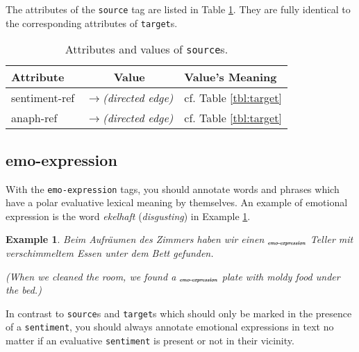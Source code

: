 \documentclass[11pt,a4paper]{article}
\newlength{\clmnwidth}
\theoremstyle{mytheoremstyle}
\newtheorem{exmp}{Example}[section]
\newcommand{\mtag}[2]{{\upshape[\emph{#2}\upshape]$_{\textrm{\bfseries\emph{\tiny
        #1}}}$}}
\newcommand{\emoexpression}[2][]{\mtag{emo-\-ex\-pression\ifstrempty{#1}{}{:#1}}{#2}}
\begin{document}
The attributes of the \texttt{source} tag are listed in Table
\ref{tbl:source}.  They are fully identical to the corresponding
attributes of \texttt{target}s.
\begin{center}
  \begin{table}[h]
    \caption{Attributes and values of \texttt{source}s.}
    \begin{tabular}{|l|c|p{0.935\clmnwidth}|}\hline
      Attribute & Value & Value's Meaning\\\hline

      sentiment-ref & \textit{$\longrightarrow$\newline(directed
        edge)} & cf. Table \ref{tbl:target}\\\hline

      anaph-ref & \textit{$\longrightarrow$\newline(directed edge)} &
      cf. Table \ref{tbl:target}\\\hline
    \end{tabular}\label{tbl:source}
  \end{table}
\end{center}

\subsection{emo-expression}
With the \texttt{emo-expression} tags, you should annotate words and
phrases which have a polar evaluative lexical meaning by themselves.
An example of emotional expression is the word \textit{ekelhaft}
(\textit{disgusting}) in Example \ref{exmp:emo-expr1}.
\begin{exmp}
  Beim Aufr\"aumen des Zimmers haben wir einen
  \emoexpression{ekelhaften} Teller mit verschimmeltem Essen unter dem
  Bett gefunden.

  (When we cleaned the room, we found a \emoexpression{disgusting}
  plate with moldy food under the bed.)\label{exmp:emo-expr1}
\end{exmp}

\noindent{}In contrast to \texttt{source}s and \texttt{target}s which
should only be marked in the presence of a \texttt{sentiment}, you
should always annotate emotional expressions in text no matter if an
evaluative \texttt{sentiment} is present or not in their vicinity.
\end{document}
